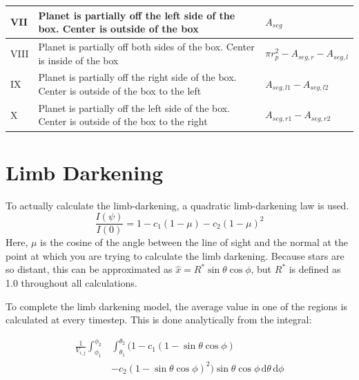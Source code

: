 \documentclass[iop]{emulateapj}
\begin{document}
\begin{table}
\begin{center}
\begin{tabular}{| m{} | m{} | m{} |}
			VII   &   Planet is partially off the left side of the box. Center is outside of the box                        & $A_{seg}$                                          \\ \hline
			VIII  &   Planet is partially off both sides of the box. Center is inside of the box                            & $\pi r_p^2 - A_{seg,r} - A_{seg,l}$ \\ \hline
			IX    &   Planet is partially off the right side of the box. Center is outside of the box to the left & $A_{seg,l1} - A_{seg,l2}$                \\ \hline
			X     &   Planet is partially off the left side of the box. Center is outside of the box to the right    & $A_{seg,r1} - A_{seg,r2}$               \\ \hline
		\end{tabular}
	\end{center}
\end{table}

\section{Limb Darkening}
To actually calculate the limb-darkening, a quadratic limb-darkening law is used.
\begin{equation}
   \frac{I(\psi)}{I(0)} = 1 - c_1 (1 - \mu) - c_2 (1 - \mu)^2
\end{equation}
Here, $\mu$ is the cosine of the angle between the line of sight and the normal at the point at which you are trying to calculate the limb darkening. Because stars are so distant, this can be approximated as $\hat{x} = R^* \sin{\theta}\cos{\phi}$, but $R^{*}$ is defined as 1.0 throughout all calculations.

To complete the limb darkening model, the average value in one of the regions is calculated at every timestep. This is done analytically from the integral:

\begin{equation}
\begin{split}
    \frac{1}{V_{i,j}} \int_{\phi_1}^{\phi_2} & \int_{\theta_1}^{\theta_2}  (1 - c_1 (1 - \sin{\theta}\cos{\phi}) \\ &- c_2 (1 - \sin{\theta}\cos{\phi})^2) \sin{\theta}\cos{\phi}\,\mathrm{d}\theta \, \mathrm{d}\phi
\end{split}
\end{equation}
\end{document}
